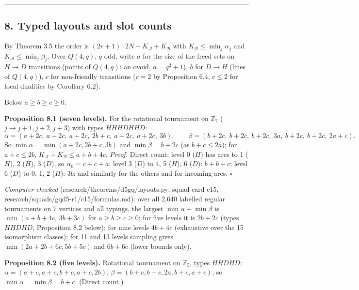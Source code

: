 \documentclass[
  11pt,
]{article}
\begin{document}
\begin{center}\rule{0.5\linewidth}{0.5pt}\end{center}

\hypertarget{typed-layouts-and-slot-counts}{%
\subsection{8. Typed layouts and slot
counts}\label{typed-layouts-and-slot-counts}}

By Theorem 3.5 the order is
\((2r+1)\cdot 2N+K_{\mathcal A}+K_{\mathcal B}\) with
\(K_{\mathcal B}\le\min_j\alpha_j\) and
\(K_{\mathcal A}\le\min_j\beta_j\). Over \(Q(4,q)\), \(q\) odd, write
\(a\) for the size of the freed sets on \(H\to D\) transitions (points
of \(Q(4,q)\): an ovoid, \(a = q^2+1\)), \(b\) for \(D\to H\) (lines of
\(Q(4,q)\)), \(c\) for non-friendly transitions (\(c = 2\) by
Proposition 6.4, \(c\le 2\) for local dualities by Corollary 6.2).

Below \(a\ge b\ge c\ge 0\).

\textbf{Proposition 8.1 (seven levels).} For the rotational tournament
on \(\mathbb Z_7\) (\(j\to j+1,j+2,j+3\)) with types \(HHHDHHD\):
\[\alpha = (a+2c,\ a+2c,\ a+2c,\ 2b+c,\ a+2c,\ a+2c,\ 3b),\qquad \beta = (b+2c,\ b+2c,\ b+2c,\ 3a,\ b+2c,\ b+2c,\ 2a+c).\]
So \(\min\alpha = \min(a+2c,2b+c,3b)\) and \(\min\beta = b+2c\) (as
\(b+c\le 2a\)); for \(a+c\le 2b\),
\(K_{\mathcal A}+K_{\mathcal B}\le a+b+4c\). \emph{Proof.} Direct count:
level 0 (\(H\)) has arcs to 1 (\(H\)), 2 (\(H\)), 3 (\(D\)), so
\(\alpha_0 = c+c+a\); level 3 (\(D\)) to 4, 5 (\(H\)), 6 (\(D\)):
\(b+b+c\); level 6 (\(D\)) to 0, 1, 2 (\(H\)): \(3b\); and similarly for
the others and for incoming arcs. \(\square\)

\emph{Computer-checked} (research/theorems/d5gq/layouts.py; squad card
c15, research/squads/gqd5-r1/c15/formulas.md): over all 2,640 labelled
regular tournaments on 7 vertices and all typings, the largest
\(\min\alpha+\min\beta\) is \(\min(a+b+4c,\,3b+3c)\) for
\(a\ge b\ge c\ge 0\); for five levels it is \(2b+2c\) (types \(HHDHD\),
Proposition 8.2 below); for nine levels \(4b+4c\) (exhaustive over the
15 isomorphism classes); for 11 and 13 levels sampling gives
\(\min(2a+2b+6c,5b+5c)\) and \(6b+6c\) (lower bounds only).

\textbf{Proposition 8.2 (five levels).} Rotational tournament on
\(\mathbb Z_5\), types \(HHDHD\): \(\alpha = (a+c, a+c, b+c, a+c, 2b)\),
\(\beta = (b+c, b+c, 2a, b+c, a+c)\), so
\(\min\alpha = \min\beta = b+c\). (Direct count.)
\end{document}

